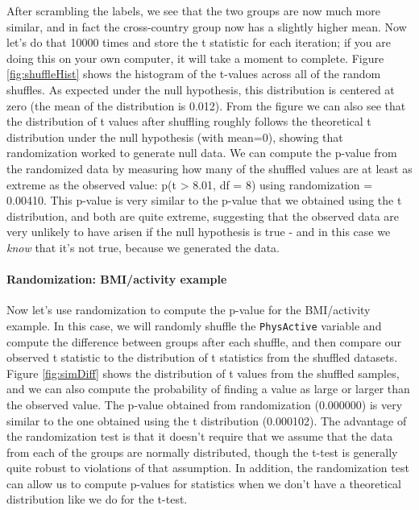 \documentclass[12pt,]{book}
\let\oldparagraph\paragraph
\renewcommand{\paragraph}[1]{\oldparagraph{#1}\mbox{}}
\theoremstyle{definition}
\theoremstyle{definition}
\theoremstyle{definition}
\theoremstyle{remark}
\begin{document}
After scrambling the labels, we see that the two groups are now much more similar, and in fact the cross-country group now has a slightly higher mean. Now let's do that 10000 times and store the t statistic for each iteration; if you are doing this on your own computer, it will take a moment to complete. Figure \ref{fig:shuffleHist} shows the histogram of the t-values across all of the random shuffles. As expected under the null hypothesis, this distribution is centered at zero (the mean of the distribution is 0.012). From the figure we can also see that the distribution of t values after shuffling roughly follows the theoretical t distribution under the null hypothesis (with mean=0), showing that randomization worked to generate null data. We can compute the p-value from the randomized data by measuring how many of the shuffled values are at least as extreme as the observed value: p(t \textgreater{} 8.01, df = 8) using randomization = 0.00410. This p-value is very similar to the p-value that we obtained using the t distribution, and both are quite extreme, suggesting that the observed data are very unlikely to have arisen if the null hypothesis is true - and in this case we \emph{know} that it's not true, because we generated the data.

\hypertarget{randomization-bmiactivity-example}{%
\paragraph{Randomization: BMI/activity example}\label{randomization-bmiactivity-example}}

Now let's use randomization to compute the p-value for the BMI/activity example. In this case, we will randomly shuffle the \texttt{PhysActive} variable and compute the difference between groups after each shuffle, and then compare our observed t statistic to the distribution of t statistics from the shuffled datasets. Figure \ref{fig:simDiff} shows the distribution of t values from the shuffled samples, and we can also compute the probability of finding a value as large or larger than the observed value. The p-value obtained from randomization (0.000000) is very similar to the one obtained using the t distribution (0.000102). The advantage of the randomization test is that it doesn't require that we assume that the data from each of the groups are normally distributed, though the t-test is generally quite robust to violations of that assumption. In addition, the randomization test can allow us to compute p-values for statistics when we don't have a theoretical distribution like we do for the t-test.
\end{document}
